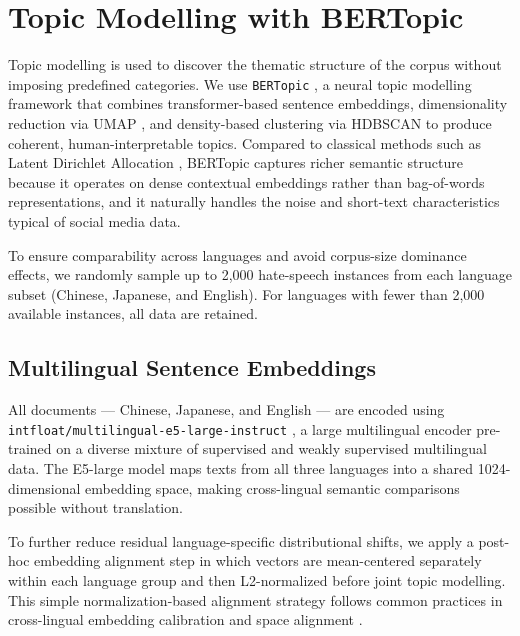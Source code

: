 \documentclass[../CLthesis.tex]{subfiles}
\begin{document}
\section{Topic Modelling with BERTopic}
\label{sec:bertopic}

Topic modelling is used to discover the thematic structure of the corpus without imposing predefined categories. We use \texttt{BERTopic} \citep{grootendorst_bertopic_2022}, a neural topic modelling framework that combines transformer-based sentence embeddings, dimensionality reduction via UMAP \citep{mcinnes2020umapuniformmanifoldapproximation}, and density-based clustering via HDBSCAN \citep{campello_density-based_2013} to produce coherent, human-interpretable topics. Compared to classical methods such as Latent Dirichlet Allocation \citep{blei2003latent}, BERTopic captures richer semantic structure because it operates on dense contextual embeddings rather than bag-of-words representations, and it naturally handles the noise and short-text characteristics typical of social media data.

To ensure comparability across languages and avoid corpus-size dominance effects, we randomly sample up to 2,000 hate-speech instances from each language subset (Chinese, Japanese, and English). For languages with fewer than 2,000 available instances, all data are retained.

\subsection{Multilingual Sentence Embeddings}

All documents — Chinese, Japanese, and English — are encoded using \texttt{intfloat/multi\allowbreak lingual-e5-large-instruct} \citep{wang2024multilinguale5textembeddings}, a large multilingual encoder pre-trained on a diverse mixture of supervised and weakly supervised multilingual data. The E5-large model maps texts from all three languages into a shared 1024-dimensional embedding space, making cross-lingual semantic comparisons possible without translation.

To further reduce residual language-specific distributional shifts, we apply a post-hoc embedding alignment step in which vectors are mean-centered separately within each language group and then L2-normalized before joint topic modelling. This simple normalization-based alignment strategy follows common practices in cross-lingual embedding calibration and space alignment \citep{artetxe2018robust,conneau2018wordtranslation}.
\end{document}
